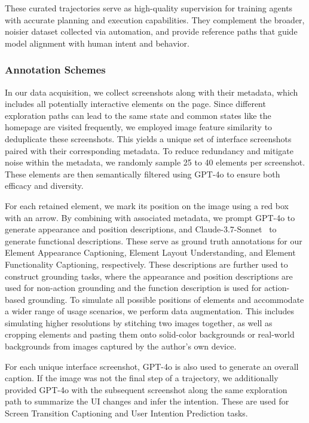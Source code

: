 These curated trajectories serve as high-quality supervision for training agents with accurate planning and execution capabilities. They complement the broader, noisier dataset collected via automation, and provide reference paths that guide model alignment with human intent and behavior.

\subsubsection{Annotation Schemes}
\label{sec:anno_scheme}
In our data acquisition, we collect screenshots along with their metadata, which includes all potentially interactive elements on the page. 
%
Since different exploration paths can lead to the same state and common states like the homepage are visited frequently, we employed image feature similarity to deduplicate these screenshots. 
%
This yields a unique set of interface screenshots paired with their corresponding metadata.
%
To reduce redundancy and mitigate noise within the metadata, we randomly sample 25 to 40 elements per screenshot. 
%
These elements are then semantically filtered using GPT-4o to ensure both efficacy and diversity. 
%

For each retained element, we mark its position on the image using a red box with an arrow. By combining with associated metadata, we prompt GPT-4o to generate appearance and position descriptions, and Claude-3.7-Sonnet~\citep{anthropic2025claude37} to generate functional descriptions. 
%
These serve as ground truth annotations for our Element Appearance Captioning, Element Layout Understanding, and Element Functionality Captioning, respectively.
%
These descriptions are further used to construct grounding tasks, where the appearance and position descriptions are used for non-action grounding and the function description is used for action-based grounding.
%
To simulate all possible positions of elements and accommodate a wider range of usage scenarios, we perform data augmentation. This includes simulating higher resolutions by stitching two images together, as well as cropping elements and pasting them onto solid-color backgrounds or real-world backgrounds from images captured by the author's own device.

%
For each unique interface screenshot, GPT-4o is also used to generate an overall caption. If the image was not the final step of a trajectory, we additionally provided GPT-4o with the subsequent screenshot along the same exploration path to summarize the UI changes and infer the intention. 
%
These are used for Screen Transition Captioning and User Intention Prediction tasks.
%

